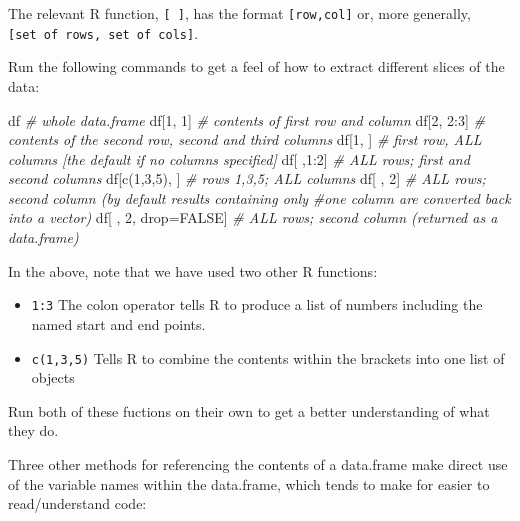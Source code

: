 \documentclass[
]{book}
\newenvironment{Shaded}{\begin{snugshade}}{\end{snugshade}}
\newcommand{\CommentTok}[1]{\textcolor[rgb]{0.56,0.35,0.01}{\textit{#1}}}
\newcommand{\ConstantTok}[1]{\textcolor[rgb]{0.00,0.00,0.00}{#1}}
\newcommand{\DecValTok}[1]{\textcolor[rgb]{0.00,0.00,0.81}{#1}}
\newcommand{\FunctionTok}[1]{\textcolor[rgb]{0.00,0.00,0.00}{#1}}
\newcommand{\NormalTok}[1]{#1}
\newcommand{\OtherTok}[1]{\textcolor[rgb]{0.56,0.35,0.01}{#1}}
\newcommand{\SpecialCharTok}[1]{\textcolor[rgb]{0.00,0.00,0.00}{#1}}
\newcommand{\StringTok}[1]{\textcolor[rgb]{0.31,0.60,0.02}{#1}}
\begin{document}
The relevant R function, \texttt{{[}\ {]}}, has the format \texttt{{[}row,col{]}} or, more generally, \texttt{{[}set\ of\ rows,\ set\ of\ cols{]}}.

Run the following commands to get a feel of how to extract different slices of the data:

\begin{Shaded}
\begin{Highlighting}[]
\NormalTok{df }\CommentTok{\# whole data.frame}
\NormalTok{df[}\DecValTok{1}\NormalTok{, }\DecValTok{1}\NormalTok{] }\CommentTok{\# contents of first row and column}
\NormalTok{df[}\DecValTok{2}\NormalTok{, }\DecValTok{2}\SpecialCharTok{:}\DecValTok{3}\NormalTok{] }\CommentTok{\# contents of the second row, second and third columns}
\NormalTok{df[}\DecValTok{1}\NormalTok{, ] }\CommentTok{\# first row, ALL columns [the default if no columns specified]}
\NormalTok{df[ ,}\DecValTok{1}\SpecialCharTok{:}\DecValTok{2}\NormalTok{] }\CommentTok{\# ALL rows; first and second columns}
\NormalTok{df[}\FunctionTok{c}\NormalTok{(}\DecValTok{1}\NormalTok{,}\DecValTok{3}\NormalTok{,}\DecValTok{5}\NormalTok{), ] }\CommentTok{\# rows 1,3,5; ALL columns}
\NormalTok{df[ , }\DecValTok{2}\NormalTok{] }\CommentTok{\# ALL rows; second column (by default results containing only }
             \CommentTok{\#one column are converted back into a vector)}
\NormalTok{df[ , }\DecValTok{2}\NormalTok{, drop}\OtherTok{=}\ConstantTok{FALSE}\NormalTok{] }\CommentTok{\# ALL rows; second column (returned as a data.frame)}
\end{Highlighting}
\end{Shaded}

In the above, note that we have used two other R functions:

\begin{itemize}
\item
  \texttt{1:3} The colon operator tells R to produce a list of numbers including the named start and end points.
\item
  \texttt{c(1,3,5)} Tells R to combine the contents within the brackets into one list of objects
\end{itemize}

Run both of these fuctions on their own to get a better understanding of what they do.

Three other methods for referencing the contents of a data.frame make direct use of the variable names within the data.frame, which tends to make for easier to read/understand code:

\begin{Shaded}
\end{Shaded}
\end{document}
